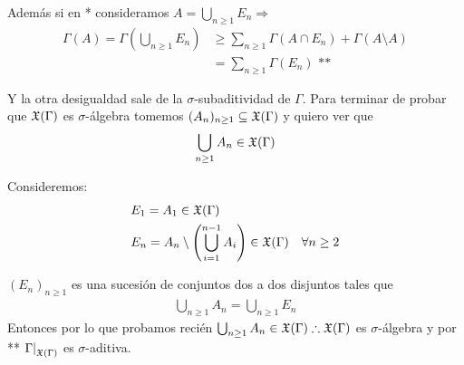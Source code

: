 Además si en * consideramos \(A = \bigcup_{n \geq 1} E_n \Rightarrow\) \begin{align*}
    \Gamma(A) = \Gamma\left( \bigcup_{n \geq 1} E_n \right) & \geq \sum_{n \geq 1} \Gamma(A \cap E_n) + \Gamma(A \setminus A) \\
                                                            & = \sum_{n \geq 1} \Gamma(E_n) \text{ **}
\end{align*}

Y la otra desigualdad sale de la \(\sigma\)-subaditividad de \(\Gamma\). Para terminar de probar que \(\mathfrak{X}(\Gamma)\) es \(\sigma\)-álgebra tomemos
\((A_n)_{n \geq 1} \subseteq \mathfrak{X}(\Gamma)\) y quiero ver que \begin{align*}
    \bigcup_{n \geq 1} A_n \in \mathfrak{X}(\Gamma)
\end{align*}

Consideremos: \begin{align*}
     & E_1= A_1 \in \mathfrak{X}(\Gamma)                                                                          \\
     & E_n = A_n \setminus \left(\bigcup_{i = 1}^{n-1} A_i\right) \in \mathfrak{X}(\Gamma) \quad \forall n \geq 2
\end{align*}

\((E_n)_{n \geq 1}\) es una sucesión de conjuntos dos a dos disjuntos tales que \begin{align*}
    \bigcup_{n \geq 1} A_n = \bigcup_{n \geq 1} E_n
\end{align*}
Entonces por lo que probamos recién \(\bigcup_{n \geq 1} A_n \in \mathfrak{X}(\Gamma) \therefore \mathfrak{X}(\Gamma)\) es \(\sigma\)-álgebra y por ** \(\restr{\Gamma}{\mf{X}(\Gamma)}\) es \(\sigma\)-aditiva.